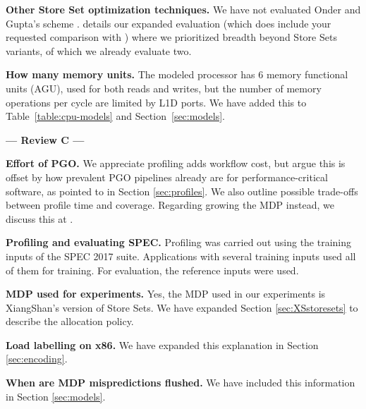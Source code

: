  \textbf{Other Store Set optimization techniques.} We have not evaluated Onder and Gupta's scheme \cite{onder}.  details our expanded evaluation (which does include your requested comparison with \cite{storedistance}) where we prioritized breadth beyond Store Sets variants, of which we already evaluate two.

 \textbf{How many memory units.} The modeled processor has 6 memory functional units (AGU), used for both reads and writes, but the number of memory operations per cycle are limited by L1D ports. We have added this to Table~\ref{table:cpu-models} and Section~\ref{sec:models}.

\vspace{-0.2cm}
\begin{center}
\textbf{--- Review C ---}
\end{center}
\vspace{-0.2cm}

 \textbf{Effort of PGO.} We appreciate profiling adds workflow cost, but argue this is offset by how prevalent PGO pipelines already are for performance-critical software, as pointed to in Section \ref{sec:profiles}. We also outline possible trade-offs between profile time and coverage. Regarding growing the MDP instead, we discuss this at .

  \textbf{Profiling and evaluating SPEC.} Profiling was carried out using the training inputs of the SPEC 2017 suite. Applications with several training inputs used all of them for training. For evaluation, the reference inputs were used.

 \textbf{MDP used for experiments.} Yes, the MDP used in our experiments is XiangShan's version of Store Sets. We have expanded Section \ref{sec:XSstoresets} to describe the allocation policy.

 \textbf{Load labelling on x86.} We have expanded this explanation in Section \ref{sec:encoding}. 

 \textbf{When are MDP mispredictions flushed.} We have included this information in Section \ref{sec:models}.



